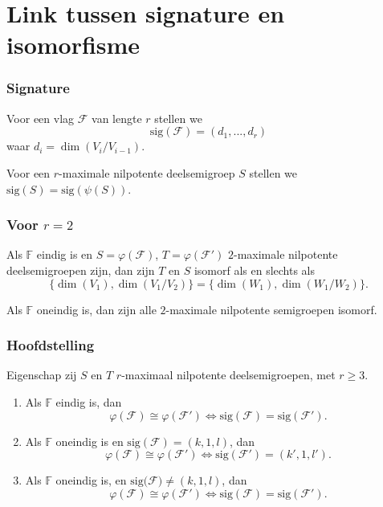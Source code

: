 \documentclass[12pt]{beamer}
\newcommand{\F}{\mathbb{F}}
\newcommand{\sig}{\mathrm{sig}}
\begin{document}
\section{Link tussen signature en isomorfisme}

\begin{frame}
\frametitle{Signature}

\begin{block}{}
Voor een vlag $\mathcal{F}$ van lengte $r$ stellen we 
$$\sig(\mathcal{F}) = (d_1, ..., d_r)$$
waar $d_i = \dim(V_i/V_{i-1})$.
\end{block}

\begin{block}{}
Voor een $r$-maximale nilpotente deelsemigroep $S$ stellen we $\sig(S) = \sig(\psi(S))$.
\end{block}

\end{frame}


\begin{frame}
\frametitle{Voor $r = 2$}

\begin{block}{}
Als $\F$ eindig is en $S = \varphi(\mathcal{F})$, $T = \varphi(\mathcal{F'})$ $2$-maximale nilpotente deelsemigroepen zijn, dan zijn $T$ en $S$ isomorf als en slechts als 
$$\{ \dim (V_1), \dim (V_1/V_2) \} = \{ \dim (W_1), \dim (W_1/W_2) \}.$$
\end{block}

\begin{block}{}
Als $\F$ oneindig is, dan zijn alle $2$-maximale nilpotente semigroepen isomorf.
\end{block}

\end{frame}

\begin{frame}
\frametitle{Hoofdstelling}
\begin{block}{Eigenschap}
zij $S$ en $T$ $r$-maximaal nilpotente deelsemigroepen, met $r\geq 3$.
\begin{enumerate}
\item Als $\F$ eindig is, dan 
$$\varphi(\mathcal{F}) \cong \varphi(\mathcal{F}') \Leftrightarrow \sig (\mathcal{F}) = \sig (\mathcal{F}').$$
\item Als $\F$ oneindig is en $\sig (\mathcal{F}) = (k,1,l)$, dan 
$$\varphi(\mathcal{F}) \cong \varphi(\mathcal{F}') \Leftrightarrow \sig(\mathcal{F}') = (k',1,l').$$
\item Als $\F$ oneindig is, en $\sig(\mathcal{F)} \neq (k,1,l)$, dan 
$$\varphi(\mathcal{F}) \cong \varphi(\mathcal{F}') \Leftrightarrow \sig(\mathcal{F}) = \sig(\mathcal{F}').$$
\end{enumerate}

\end{block}

\end{frame}
\end{document}
